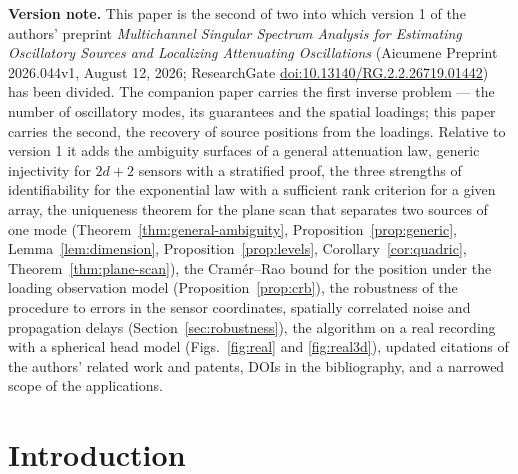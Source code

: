 \documentclass{article}
\begin{document}
\noindent\textbf{Version note.} This paper is the second of two into which version 1 of the authors' preprint \emph{Multichannel Singular Spectrum Analysis for Estimating Oscillatory Sources and Localizing Attenuating Oscillations} \cite{ref-MSSAv1} (Aicumene Preprint 2026.044v1, August 12, 2026; ResearchGate \href{https://doi.org/10.13140/RG.2.2.26719.01442}{doi:10.13140/RG.2.2.26719.01442}) has been divided. The companion paper \cite{ref-companionA} carries the first inverse problem --- the number of oscillatory modes, its guarantees and the spatial loadings; this paper carries the second, the recovery of source positions from the loadings. Relative to version 1 it adds the ambiguity surfaces of a general attenuation law, generic injectivity for $2d + 2$ sensors with a stratified proof, the three strengths of identifiability for the exponential law with a sufficient rank criterion for a given array, the uniqueness theorem for the plane scan that separates two sources of one mode (Theorem~\ref{thm:general-ambiguity}, Proposition~\ref{prop:generic}, Lemma~\ref{lem:dimension}, Proposition~\ref{prop:levels}, Corollary~\ref{cor:quadric}, Theorem~\ref{thm:plane-scan}), the Cram\'er--Rao bound for the position under the loading observation model (Proposition~\ref{prop:crb}), the robustness of the procedure to errors in the sensor coordinates, spatially correlated noise and propagation delays (Section~\ref{sec:robustness}), the algorithm on a real recording with a spherical head model (Figs.~\ref{fig:real} and \ref{fig:real3d}), updated citations of the authors' related work and patents, DOIs in the bibliography, and a narrowed scope of the applications.


\section{Introduction}\label{sec:introduction}
\end{document}
